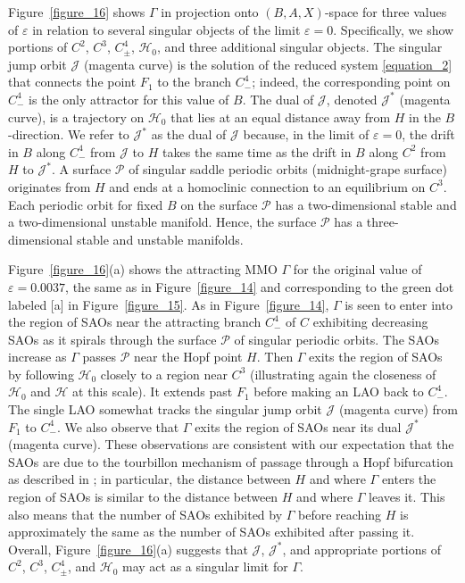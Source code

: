 \documentclass{ws-ijbc}
\begin{document}
Figure~\ref{figure_16} shows $\Gamma$ in projection onto $(B,A,X)$-space for three values of $\varepsilon$ in relation to several singular objects of the limit $\varepsilon = 0$.  Specifically, we show portions of $C^2$, $C^3$, $C^4_\pm$, $\mathscr{H}_0$, and three additional singular objects.  The singular jump orbit $\mathscr{J}$ (magenta curve) is the solution of the reduced system \eqref{equation_2} that connects the point $F_1$ to the branch $C^4_-$; indeed, the corresponding point on $C^4_-$ is the only attractor for this value of $B$.  The dual of $\mathscr{J}$, denoted $\mathscr{J}^*$ (magenta curve), is a trajectory on $\mathscr{H}_0$ that lies at an equal distance away from $H$ in the $B$-direction.  We refer to $\mathscr{J}^*$ as the dual of $\mathscr{J}$ because, in the limit of $\varepsilon = 0$, the drift in $B$ along $C^4_-$ from $\mathscr{J}$ to $H$ takes the same time as the drift in $B$ along $C^2$ from $H$ to $\mathscr{J}^*$.  A surface $\mathscr{P}$ of singular saddle periodic orbits (midnight-grape surface) originates from $H$ and ends at a homoclinic connection to an equilibrium on $C^3$.  Each periodic orbit for fixed $B$ on the surface $\mathscr{P}$ has a two-dimensional stable and a two-dimensional unstable manifold.  Hence, the surface $\mathscr{P}$ has a three-dimensional stable and unstable manifolds.

Figure~\ref{figure_16}(a) shows the attracting MMO $\Gamma$ for the original value of $\varepsilon=0.0037$, the same as in Figure~\ref{figure_14} and corresponding to the green dot labeled [a] in Figure~\ref{figure_15}.  As in Figure~\ref{figure_14}, $\Gamma$ is seen to enter into the region of SAOs near the attracting branch $C^4_-$ of $C$ exhibiting decreasing SAOs as it spirals through the surface $\mathscr{P}$ of singular periodic orbits. The SAOs increase as $\Gamma$ passes $\mathscr{P}$ near the Hopf point $H$.  Then $\Gamma$ exits the region of SAOs by following $\mathscr{H}_0$ closely to a region near $C^3$ (illustrating again the closeness of $\mathscr{H}_0$ and $\mathscr{H}$ at this scale).  It extends past $F_1$ before making an LAO back to $C^4_-$.  The single LAO somewhat tracks the singular jump orbit $\mathscr{J}$ (magenta curve) from $F_1$ to $C^4_-$.  We also observe that $\Gamma$ exits the region of SAOs near its dual $\mathscr{J}^*$ (magenta curve).  These observations are consistent with our expectation that the SAOs are due to the tourbillon mechanism of passage through a Hopf bifurcation as described in \cite{MMO}; in particular, the distance between $H$ and where $\Gamma$ enters the region of SAOs is similar to the distance between $H$ and where $\Gamma$ leaves it.  This also means that the number of SAOs exhibited by $\Gamma$ before reaching $H$ is approximately the same as the number of SAOs exhibited after passing it.  Overall, Figure~\ref{figure_16}(a) suggests that $\mathscr{J}$, $\mathscr{J}^*$, and appropriate portions of $C^2$, $C^3$, $C^4_\pm$, and $\mathscr{H}_0$ may act as a singular limit for $\Gamma$.
\end{document}
